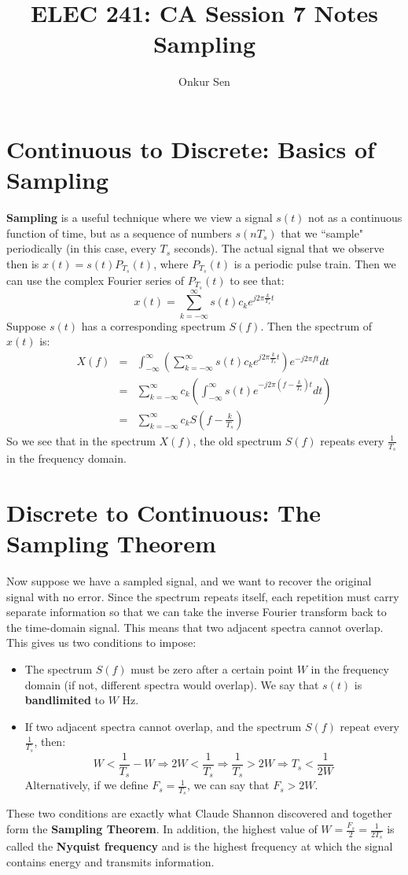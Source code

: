 \documentclass[11pt]{article}
\title{ELEC 241: CA Session 7 Notes\\Sampling}
\author{Onkur Sen}
\date{}
\begin{document}
\maketitle

\section*{Continuous to Discrete: Basics of Sampling}
{\bf Sampling} is a useful technique where we view a signal $s(t)$ not as a continuous function of time, but as a sequence of numbers $s(nT_s)$ that we ``sample" periodically (in this case, every $T_s$ seconds). The actual signal that we observe then is $x(t) = s(t) P_{T_s}(t)$, where $P_{T_s}(t)$ is a periodic pulse train. Then we can use the complex Fourier series of $P_{T_s}(t)$ to see that:
\[x(t) = \sum_{k=-\infty}^{\infty} s(t) c_k e^{j 2 \pi \frac{k}{T_s} t} \]
Suppose $s(t)$ has a corresponding spectrum $S(f)$. Then the spectrum of $x(t)$ is:
\begin{eqnarray*}
X(f) &=& \int_{-\infty}^{\infty} \left( \sum_{k=-\infty}^{\infty} s(t) c_k e^{j 2 \pi \frac{k}{T_s} t} \right) e^{-j 2 \pi f t} dt \\ 
&=&  \sum_{k=-\infty}^{\infty} c_k \left(  \int_{-\infty}^{\infty} s(t) e^{-j 2 \pi (f-\frac{k}{T_s}) t} dt \right) \\
&=&  \sum_{k=-\infty}^{\infty} c_k S \left(f - \frac{k}{T_s} \right)
\end{eqnarray*}
So we see that in the spectrum $X(f)$, the old spectrum $S(f)$ repeats every $\frac{1}{T_s}$ in the frequency domain.

\section*{Discrete to Continuous: The Sampling Theorem} 
Now suppose we have a sampled signal, and we want to recover the original signal with no error. Since the spectrum repeats itself, each repetition must carry separate information so that we can take the inverse Fourier transform back to the time-domain signal. This means that two adjacent spectra cannot overlap. This gives us two conditions to impose:

\begin{itemize}
\item The spectrum $S(f)$ must be zero after a certain point $W$ in the frequency domain (if not, different spectra would overlap). We say that $s(t)$ is {\bf bandlimited} to $W$ Hz.
\item If two adjacent spectra cannot overlap, and the spectrum $S(f)$ repeat every $\frac{1}{T_s}$, then:
\[W < \frac{1}{T_s} - W \Longrightarrow 2W < \frac{1}{T_s} \Longrightarrow \frac{1}{T_s} > 2W \Longrightarrow \boxed{T_s < \frac{1}{2W}}\]
Alternatively, if we define $F_s = \frac{1}{T_s}$, we can say that $\boxed{F_s > 2W}$.
\end{itemize}

\noindent These two conditions are exactly what Claude Shannon discovered and together form the {\bf Sampling Theorem}. In addition, the highest value of $W = \frac{F_s}{2} = \frac{1}{2T_s}$ is called the {\bf Nyquist frequency} and is the highest frequency at which the signal contains energy and transmits information.
\end{document}
